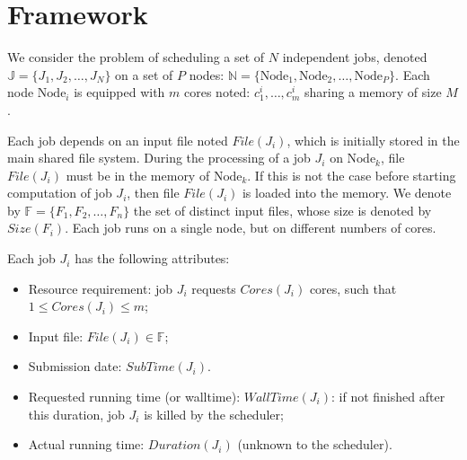 \documentclass[conference,10pt]{IEEEtran}
\newcommand{\Node}[1]{\ensuremath{\mathrm{Node}_{#1}}\xspace}
\newcommand{\file}{\ensuremath{\mathit{File}}\xspace}
\newcommand{\size}{\ensuremath{\mathit{Size}}\xspace}
\newcommand{\memory}{\ensuremath{\mathit{M}}\xspace}
\newcommand{\duration}{\mathit{Duration}\xspace}
\newcommand{\core}{\mathit{Cores}\xspace}
\newcommand{\submissiontime}{\mathit{SubTime}\xspace}
\newcommand{\walltime}{\mathit{WallTime}\xspace}
\newcommand{\fileset}{\ensuremath{\mathbb{F}}\xspace}
\newcommand{\jobset}{\ensuremath{\mathbb{J}}\xspace}
\newcommand{\nodeset}{\ensuremath{\mathbb{N}}\xspace}
\begin{document}

\section{Framework}\label{sec.framework}

We consider the problem of scheduling a set of $N$ independent jobs,
denoted $\jobset = \{J_1, J_2, \ldots, J_N\}$ on a set of $P$ nodes:
$\nodeset = \{\Node{1}, \Node{2}, \ldots, \Node{P}\}$.
Each node $\Node{i}$ is equipped with $m$ cores noted:
$c^i_1,\ldots,c^i_m$ sharing a memory of size $\memory$.

Each job depends on an input file noted $\file(J_i)$, which is
initially stored in the main shared file system.  During the
processing of a job $J_i$ on $\Node{k}$, file $\file(J_i)$ must be in
the memory of $\Node{k}$. If this is not the case before starting
computation of job $J_i$, then file $\file(J_i)$ is loaded into the
memory.  We denote by $\fileset = \{F_1, F_2, \ldots, F_n\}$ the set
of distinct input files, whose size is denoted by $\size(F_i)$. Each
job runs on a single node, but on different numbers of cores.



Each job $J_i$ has the following attributes:
\begin{itemize}
\item Resource requirement: job $J_i$ requests $\core(J_i)$  cores, such that $1 \leq \core(J_i) \leq m$;
\item Input file: $\file(J_i) \in \fileset$;
\item Submission date: $\submissiontime(J_i)$.
\item Requested running time (or walltime): $\walltime(J_i)$: if not
  finished after this duration, job $J_i$ is killed by the scheduler;
\item Actual running time: $\duration(J_i)$ (unknown to  the scheduler).
\end{itemize}
\end{document}
